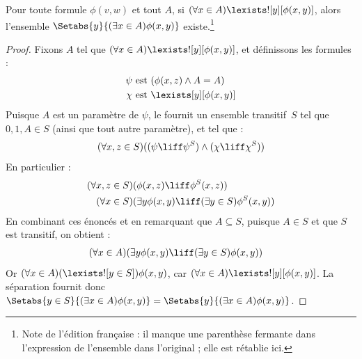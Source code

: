 \documentclass[../../../include/open-logic-section]{subfiles}
\begin{document}
\begin{thm}\label{thm:replacement}
Pour toute formule $\phi(v,w)$ et tout $A$, si
$(\forall x \in A)\lexists![y][\phi(x,y)]$, alors
l'ensemble $\Setabs{y}{(\exists x \in A)\phi(x,y)}$
existe.\footnote{Note de l'édition française : il manque
une parenthèse fermante dans l'expression de l'ensemble
dans l'original ; elle est rétablie ici.}
\end{thm}

\begin{proof}
Fixons $A$ tel que
$(\forall x \in A)\lexists![y][\phi(x,y)]$,
et définissons les formules :
\begin{align*}
	\psi &\text{ est } (\phi(x, z) \land A = A)\\
	\chi &\text{ est } \lexists[y][\phi(x, y)]
\end{align*}
Puisque $A$ est un paramètre de $\psi$, le
 fournit un ensemble
transitif~$S$ tel que $0, 1, A \in S$ (ainsi
que tout autre paramètre), et tel que :
\[
	(\forall x,z \in S)((\psi \liff \psi^S)
	\land (\chi \liff \chi^S))
\]
En particulier :
\begin{align*}
	(\forall  x, z \in S)(&\phi(x, z) \liff \phi^S(x, z))\\
	(\forall x \in S)(&\exists y\phi(x, y) \liff
	(\exists y \in S)\phi^S(x, y))
\end{align*}
En combinant ces énoncés et en remarquant que
$A \subseteq S$, puisque $A \in S$ et que
$S$ est transitif, on obtient :
\begin{align*}
	(\forall x \in A)(&\exists y\phi(x, y) \liff
	(\exists y \in S)\phi(x, y))
\end{align*}
Or $(\forall x \in A)(\lexists![y \in S])\phi(x, y)$,
car $(\forall x \in A)\lexists![y][\phi(x, y)]$.
La séparation fournit donc
$\Setabs{y \in S}{(\exists x \in A) \phi(x, y)}
= \Setabs{y}{(\exists x \in A) \phi(x, y)}$.
\end{proof}
\end{document}
